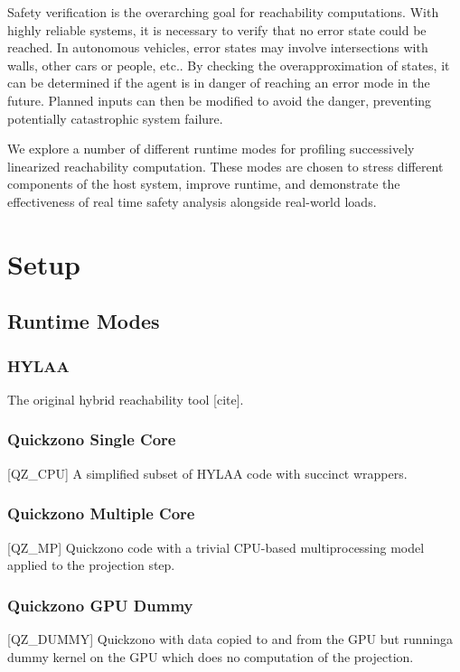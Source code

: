 \documentclass[runningheads]{llncs}
\begin{document}
Safety verification is the overarching goal for reachability computations. With highly reliable systems, it is necessary to verify that no error state could be reached. In autonomous vehicles, error states may involve intersections with walls, other cars or people, etc.. By checking the overapproximation of states, it can be determined if the agent is in danger of reaching an error mode in the future. Planned inputs can then be modified to avoid the danger, preventing potentially catastrophic system failure.

We explore a number of different runtime modes for profiling successively linearized reachability computation. These modes are chosen to stress different components of the host system, improve runtime, and demonstrate the effectiveness of real time safety analysis alongside real-world loads.


\section{Setup}


\subsection{Runtime Modes}

\subsubsection{HYLAA} \newline The original hybrid reachability tool [cite].
\vspace*{-5pt}
\subsubsection{Quickzono Single Core} [QZ\_CPU] \newline A simplified subset of HYLAA code with succinct wrappers. 
\vspace*{-5pt}
\subsubsection{Quickzono Multiple Core} [QZ\_MP] \newline Quickzono code with a trivial CPU-based multiprocessing model \newline applied to the projection step. 
\vspace*{-5pt}
\subsubsection{Quickzono GPU Dummy} [QZ\_DUMMY] \newline Quickzono with data copied to and from the GPU but running\newline a dummy kernel on the GPU which does no computation of the projection. 
\vspace*{-5pt}
\end{document}
